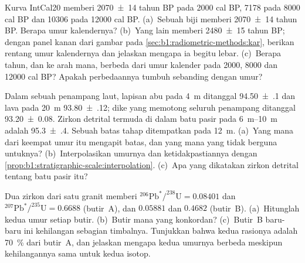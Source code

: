\begin{exercise}[$\star\star$]\label{exo:b1:radiometric-methods:7}
Kurva IntCal20 memberi  \num[uncertainty-mode=separate]{2070 \pm 14} tahun BP pada \num{2000} cal BP, \num{7178} pada \num{8000} cal BP dan \num{10306} pada \num{12000} cal BP. (a)~Sebuah biji memberi \num[uncertainty-mode=separate]{2070 \pm 14} tahun BP. Berapa umur kalendernya? (b)~Yang lain memberi \num[uncertainty-mode=separate]{2480 \pm 15} tahun BP; dengan panel kanan dari gambar pada
\cref{sec:b1:radiometric-methods:kar}, berikan rentang umur kalendernya dan jelaskan mengapa ia begitu lebar. (c)~Berapa tahun, dan ke arah mana,  berbeda dari umur kalender pada \num{2000}, \num{8000} dan \num{12000} cal BP? Apakah perbedaannya tumbuh sebanding dengan umur?
\end{exercise}

\begin{exercise}[$\star\star$]\label{exo:b1:radiometric-methods:8}
Dalam sebuah penampang laut, lapisan abu pada \qty{4}{m} ditanggal
\qty[uncertainty-mode=separate]{94.50(10)}{\Ma} dan lava pada \qty{20}{m}
\qty[uncertainty-mode=separate]{93.80(12)}{\Ma}; dike yang memotong seluruh
penampang ditanggal \qty[uncertainty-mode=separate]{93.20(8)}{\Ma}. Zirkon detrital termuda di dalam batu pasir pada \qtyrange{6}{10}{m} adalah
\qty[uncertainty-mode=separate]{95.3(4)}{\Ma}. Sebuah batas tahap ditempatkan pada
\qty{12}{m}. (a)~Yang mana dari keempat umur itu mengapit batas, dan yang mana yang tidak berguna untuknya? (b)~Interpolasikan umurnya dan ketidakpastiannya dengan
\cref{prop:b1:stratigraphic-scale:interpolation}. (c)~Apa yang dikatakan zirkon detrital tentang batu pasir itu?
\end{exercise}

\begin{exercise}[$\star\star$]\label{exo:b1:radiometric-methods:9}
Dua zirkon dari satu granit memberi
$^{206}\mathrm{Pb}^*/^{238}\mathrm{U} = 0.08401$ dan
$^{207}\mathrm{Pb}^*/^{235}\mathrm{U} = 0.6688$ (butir~A), dan $0.05881$ dan
$0.4682$ (butir~B). (a)~Hitunglah kedua umur setiap butir. (b)~Butir mana yang konkordan? (c)~Butir~B baru-baru ini kehilangan sebagian timbalnya. Tunjukkan bahwa kedua rasionya adalah \qty{70}{\percent} dari butir~A, dan jelaskan mengapa kedua umurnya berbeda meskipun kehilangannya sama untuk kedua isotop.
\end{exercise}

